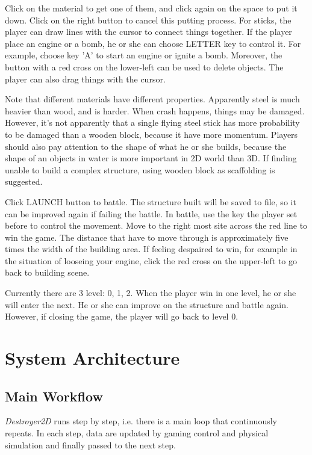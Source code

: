 \documentclass[UTF8]{ctexart}
\begin{document}
        Click on the material to get one of them, and click again on the space to put it down. Click on the right button to cancel this putting process. For sticks, the player can draw lines with the cursor to connect things together. If the player place an engine or a bomb, he or she can choose LETTER key to control it. For example, choose key 'A' to start an engine or ignite a bomb. Moreover, the button with a red cross on the lower-left can be used to delete objects. The player can also drag things with the cursor.

        Note that different materials have different properties. Apparently steel is much heavier than wood, and is harder. When crash happens, things may be damaged. However, it's not apparently that a single flying steel stick has more probability to be damaged than a wooden block, because it have more momentum. Players should also pay attention to the shape of what he or she builds, because the shape of an objects in water is more important in 2D world than 3D. If finding unable to build a complex structure, using wooden block as scaffolding is suggested.

        Click LAUNCH button to battle. The structure built will be saved to file, so it can be improved again if failing the battle. In battle, use the key the player set before to control the movement. Move to the right most site across the red line to win the game. The distance that have to move through is approximately five times the width of the building area. If feeling despaired to win, for example in the situation of looseing your engine, click the red cross on the upper-left to go back to building scene.

        Currently there are 3 level: 0, 1, 2. When the player win in one level, he or she will enter the next. He or she can improve on the structure and battle again. However, if closing the game, the player will go back to level 0.

    \section{System Architecture}

        \subsection{Main Workflow}

            \textit{Destroyer2D} runs step by step, i.e. there is a main loop that continuously repeats. In each step, data are updated by gaming control and physical simulation and finally passed to the next step.
\end{document}

